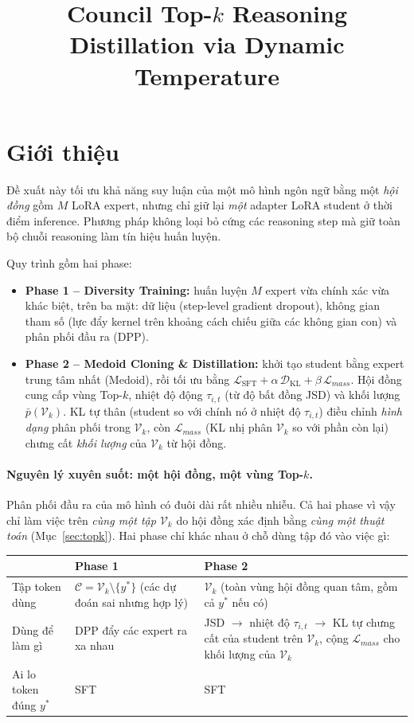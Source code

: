 \documentclass[12pt,a4paper]{article}
\title{\textbf{Council Top-$k$ Reasoning Distillation via Dynamic Temperature}}
\author{}
\date{}
\theoremstyle{plain}
\DeclareMathOperator{\KL}{KL}
\newcommand{\Vk}{\mathcal V_k}
\newcommand{\Cset}{\mathcal C}
\newcommand{\ytar}{y^{*}}
\begin{document}
\maketitle

\section{Giới thiệu}
\label{sec:intro}

Đề xuất này tối ưu khả năng suy luận của một mô hình ngôn ngữ bằng một \emph{hội đồng} gồm $M$ LoRA expert, nhưng chỉ giữ lại \emph{một} adapter LoRA student ở thời điểm inference. Phương pháp không loại bỏ cứng các reasoning step mà giữ toàn bộ chuỗi reasoning làm tín hiệu huấn luyện.

Quy trình gồm hai phase:
\begin{itemize}
\item \textbf{Phase 1 -- Diversity Training:} huấn luyện $M$ expert vừa chính xác vừa khác biệt, trên ba mặt: dữ liệu (step-level gradient dropout), không gian tham số (lực đẩy kernel trên khoảng cách chiếu giữa các không gian con) và phân phối đầu ra (DPP).
\item \textbf{Phase 2 -- Medoid Cloning \& Distillation:} khởi tạo student bằng expert trung tâm nhất (Medoid), rồi tối ưu bằng $\mathcal L_{\mathrm{SFT}}+\alpha\,\mathcal D_{\KL}+\beta\,\mathcal L_{mass}$. Hội đồng cung cấp vùng Top-$k$, nhiệt độ động $\tau_{i,t}$ (từ độ bất đồng JSD) và khối lượng $\bar p(\Vk)$. KL tự thân (student so với chính nó ở nhiệt độ $\tau_{i,t}$) điều chỉnh \emph{hình dạng} phân phối trong $\Vk$, còn $\mathcal L_{mass}$ (KL nhị phân $\Vk$ so với phần còn lại) chưng cất \emph{khối lượng} của $\Vk$ từ hội đồng.
\end{itemize}

\paragraph{Nguyên lý xuyên suốt: một hội đồng, một vùng Top-$k$.}
Phân phối đầu ra của mô hình có đuôi dài rất nhiều nhiễu. Cả hai phase vì vậy chỉ làm việc trên \emph{cùng một tập $\Vk$} do hội đồng xác định bằng \emph{cùng một thuật toán} (Mục~\ref{sec:topk}). Hai phase chỉ khác nhau ở chỗ dùng tập đó vào việc gì:

\begin{center}
\begin{tabularx}{\textwidth}{@{}lXX@{}}
\toprule
 & Phase 1 & Phase 2 \\
\midrule
Tập token dùng & $\Cset=\Vk\setminus\{\ytar\}$ (các dự đoán sai nhưng hợp lý) & $\Vk$ (toàn vùng hội đồng quan tâm, gồm cả $\ytar$ nếu có) \\
Dùng để làm gì & DPP đẩy các expert ra xa nhau & JSD $\to$ nhiệt độ $\tau_{i,t}$ $\to$ KL tự chưng cất của student trên $\Vk$, cộng $\mathcal L_{mass}$ cho khối lượng của $\Vk$ \\
Ai lo token đúng $\ytar$ & SFT & SFT \\
\bottomrule
\end{tabularx}
\end{center}
\end{document}
